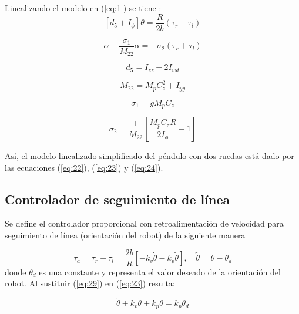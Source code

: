 \documentclass{article}
\begin{document}
Linealizando el modelo en (\ref{eq:1}) se tiene \citep{HernandezBook2024}:
\begin{equation}
    \boxed{[d_5+I_\phi]\ddot{\theta}=\dfrac{R}{2b}(\tau_r-\tau_l)}
    \label{eq:23}
\end{equation}

\begin{equation}
    \boxed{\ddot{\alpha}-\dfrac{\sigma_1}{M_{22}}\alpha=-\sigma_2(\tau_r+\tau_l)}
    \label{eq:24}
\end{equation}

\begin{equation}
    d_5=I_{zz}+2I_{wd}
    \label{eq:25}
\end{equation}

\begin{equation}
    M_{22}=M_pC_z^2+I_{yy}
    \label{eq:26}
\end{equation}

\begin{equation}
    \sigma_1=gM_pC_z
    \label{eq:27}
\end{equation}

\begin{equation}
    \sigma_2=\dfrac{1}{M_{22}}\left[\dfrac{M_pC_zR}{2I_\phi}+1\right]
    \label{eq:28}
\end{equation} 

Así, el modelo linealizado simplificado del péndulo con dos ruedas está dado por las ecuaciones (\ref{eq:22}), (\ref{eq:23}) y (\ref{eq:24}).

\subsection{Controlador de seguimiento de línea}
Se define el controlador proporcional con retroalimentación de velocidad para seguimiento de línea (orientación del robot) de la siguiente manera \citep{HernandezBook2024}

\begin{equation}
    \boxed{\tau_a=\tau_r-\tau_l=\frac{2b}{R}\left[-k_v\dot{\theta}-k_p\tilde{\theta}\right], \quad \tilde{\theta}=\theta-\theta_d}
    \label{eq:29}
\end{equation}
donde $\theta_d$ es una constante y representa el valor deseado de la orientación del robot. Al sustituir (\ref{eq:29}) en (\ref{eq:23}) resulta:

\begin{equation}
    [d_5+I_\phi]\ddot{\theta}+k_v\dot{\theta}+k_p\theta=k_p\theta_d
    \label{eq:30}
\end{equation}
\end{document}

